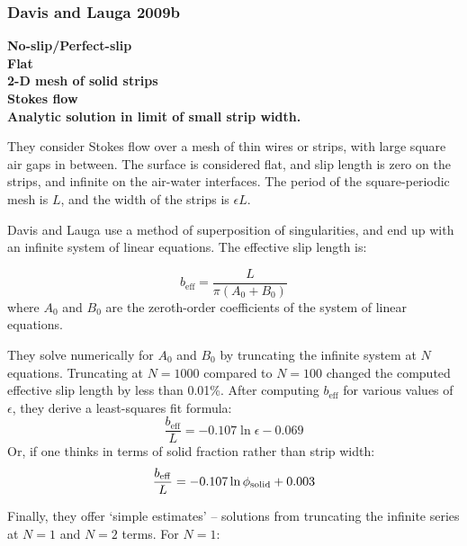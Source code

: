 \documentclass{article}
\newcommand{\beff}{\ensuremath{b_{\mathrm{eff}}}}
\begin{document}
\subsubsection*{Davis and Lauga 2009b}
\textbf{No-slip/Perfect-slip \\ Flat \\ 2-D mesh of solid strips \\ Stokes flow
\\ Analytic solution in limit of small strip width.}

They consider Stokes flow over a mesh of thin wires or strips, with large square air gaps in between.  The surface is considered flat, and slip length is zero on the strips, and infinite on the air-water interfaces.  The period of the square-periodic mesh is $L$, and the width of the strips is $\epsilon L$.
\vspace*{1em} 


\vspace*{1em}
Davis and Lauga use a method of superposition of singularities, and end up with an infinite system of linear equations.  The effective slip length is:

\[ \beff = \frac{L}{\pi (A_0 + B_0)} \]
where $A_0$ and $B_0$ are the zeroth-order coefficients of the system of linear equations.

They solve numerically for $A_0$ and $B_0$ by truncating the infinite system at $N$ equations.  Truncating at $N=1000$ compared to $N=100$ changed the computed effective slip length by less than 0.01\%. After computing $\beff$ for various values of $\epsilon$, they derive a least-squares fit formula:
\[ \frac{\beff}{L} = -0.107 \ln \epsilon - 0.069 \]
Or, if one thinks in terms of solid fraction rather than strip width:
\[ \frac{\beff}{L} = -0.107 \ln \phisol + 0.003 \] 

Finally, they offer `simple estimates' -- solutions from truncating the infinite series at $N=1$ and $N=2$ terms.  For $N=1$:
\end{document}
